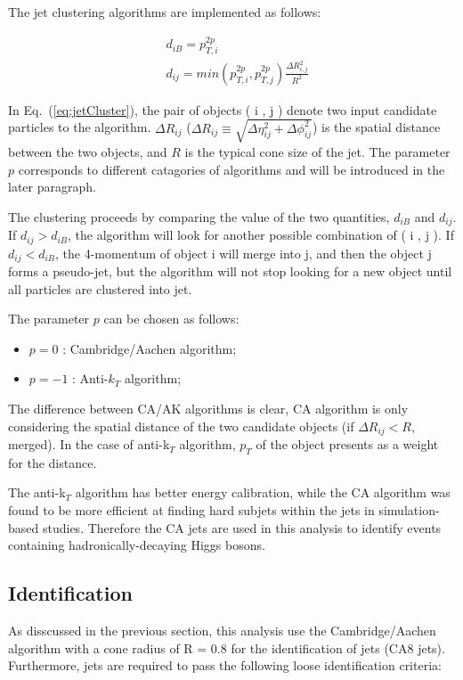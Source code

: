 The jet clustering algorithms are implemented as follows:

\begin{align}
  \label{eq:jetCluster}
  &d_{iB}=p_{T,i}^{2p}\nonumber \\
  &d_{ij}=min(p_{T,i}^{2p}, p_{T,j}^{2p})\frac{\Delta R_{i,j}^{2}}{R^{2}}
\end{align}

In Eq.~(\ref{eq:jetCluster}), the pair of objects ( i , j ) denote two input candidate particles to the algorithm. $\Delta R_{ij}$ ($\Delta R_{ij} \equiv\sqrt{\Delta\eta_{ij}^{2}+\Delta\phi_{ij}^{2}}$) is the spatial distance between the two objects, and $R$ is the typical cone size of the jet. The parameter $p$ corresponds to different catagories of algorithms and will be introduced in the later paragraph.

The clustering proceeds by comparing the value of the two quantities, $d_{iB}$ and $d_{ij}$. If $d_{ij} > d_{iB}$, the algorithm will look for another possible combination of ( i , j ).  If $d_{ij} < d_{iB}$, the 4-momentum of object i will merge into j, and then the object j forms a pseudo-jet, but the algorithm will not stop looking for a new object until all particles are clustered into jet.

The parameter $p$ can be chosen as follows:

\begin{itemize}
\item $p = 0$ : Cambridge/Aachen algorithm;
\item $p = -1$ : Anti-$k_{T}$ algorithm;
\end{itemize}

The difference between CA/AK algorithms is clear, CA algorithm is only considering the spatial distance of the two candidate objects (if $\Delta R_{ij} < R$, merged). In the case of anti-k$_{T}$ algorithm, $p_{T}$ of the object presents as a weight for the distance.

The anti-k$_{T}$ algorithm has better energy calibration, while the CA algorithm was found to be more efficient at finding hard subjets within the jets in simulation-based studies\cite{CAalgo3}. Therefore the CA jets are used in this analysis to identify events containing hadronically-decaying Higgs bosons.

\subsection*{Identification}
As disscussed in the previous section, this analysis use the Cambridge/Aachen algorithm with a cone radius of R = 0.8 for the identification of jets (CA8 jets). Furthermore, jets are required to pass the following loose identification criteria\cite{JetID,JetID2}:\\

